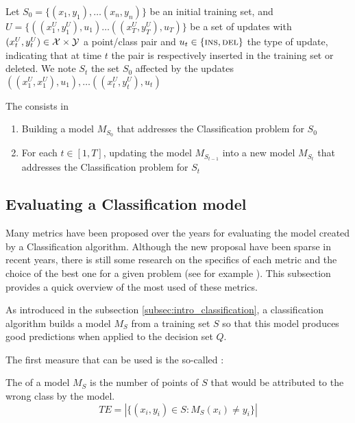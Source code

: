 \begin{definition}
Let $S_0 = \{(x_1, y_1), \dots (x_n, y_n)\}$ be an initial training set, and $U = \{((x^U_1, y^U_1), u_1) \dots ((x^U_T, y^U_T), u_T)\}$ be a set of updates with $(x^U_t, y^U_t) \in \mathcal{X} \times \mathcal{Y}$ a point/class pair and $u_t \in \{\textsc{ins}, \textsc{del}\}$ the type of update, indicating that at time $t$ the pair is respectively inserted in the training set or deleted. We note $S_t$ the set $S_0$ affected by the updates $((x^U_1, x^U_1), u_1), \dots ((x^U_t, y^U_t), u_t)$

The  consists in
\begin{enumerate}
    \item Building a model $M_{S_0}$ that addresses the Classification problem for $S_0$
    \item For each $t \in [1, T]$, updating the model $M_{S_{t-1}}$ into a new model $M_{S_t}$ that addresses the Classification problem for $S_t$
\end{enumerate}
\end{definition}

\subsection{Evaluating a Classification model}\label{subsec:intro_class_metrics}
Many metrics have been proposed over the years for evaluating the model created by a Classification algorithm. Although the new proposal have been sparse in recent years, there is still some research on the specifics of each metric and the choice of the best one for a given problem (see for example \cite{Canbek2017_Class_metrics_terminology}). This subsection provides a quick overview of the most used of these metrics.

As introduced in the subsection \ref{subsec:intro_classification}, a classification algorithm builds a model $M_S$ from a training set $S$ so that this model produces good predictions when applied to the decision set $Q$.

The first measure that can be used is the so-called :
\begin{definition}
    The  of a model $M_S$ is the number of points of $S$ that would be attributed to the wrong class by the model.
    \begin{equation}
        TE = |\{(x_i, y_i)\in S: M_S(x_i) \neq y_i\}|
    \end{equation}
\end{definition}


